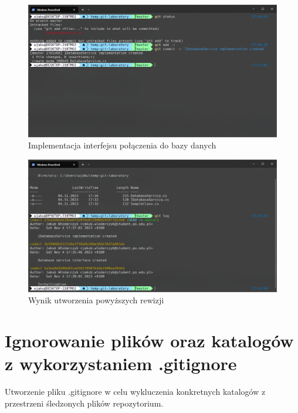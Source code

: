 \documentclass{article}
\begin{document}
\vspace*{\fill}
\begin{figure}[!h]
    \caption{Implementacja interfejsu połączenia do bazy danych}
    \centerline{\includegraphics [scale=0.5]{database-service-implementation.PNG}}
    \label{fig:label}
\end{figure}
\vspace*{\fill}
\newpage

\vspace*{\fill}
\begin{figure}[!h]
    \caption{Wynik utworzenia powyższych rewizji}
    \centerline{\includegraphics [scale=0.5]{first-log.PNG}}
    \label{fig:label}
\end{figure}
\vspace*{\fill}
\newpage

\section{Ignorowanie plików oraz katalogów z wykorzystaniem .gitignore}

Utworzenie pliku .gitignore w celu wykluczenia konkretnych katalogów z przestrzeni śledzonych plików repozytorium.
\end{document}

